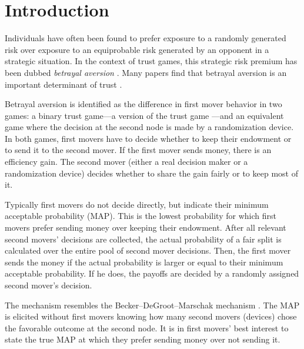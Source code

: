 \section{Introduction}\label{sec:intro}
Individuals have often been found to prefer exposure to a randomly generated risk over exposure to an equiprobable risk generated by an opponent in a strategic situation.
In the context of trust games, this strategic risk premium has been dubbed \textit{betrayal aversion} \citep{Bohnet2004}.
Many papers find that betrayal aversion is an important determinant of trust \citep{Bohnet2004, Aimone2015, Fairley2016, Quercia2016, Bacine2018, Butler2018, Polipciuc2022motive}.

Betrayal aversion is identified as the difference in first mover behavior in two games: a binary trust game---a version of the trust game \citep{Berg1995}---and an equivalent game where the decision at the second node is made by a randomization device.
In both games, first movers have to decide whether to keep their endowment or to send it to the second mover.
If the first mover sends money, there is an efficiency gain.
The second mover (either a real decision maker or a randomization device) decides whether to share the gain fairly or to keep most of it.

Typically first movers do not decide directly, but indicate their minimum acceptable probability (MAP).
This is the lowest probability for which first movers prefer sending money over keeping their endowment.
After all relevant second movers' decisions are collected, the actual probability of a fair split is calculated over the entire pool of second mover decisions.
Then, the first mover sends the money if the actual probability is larger or equal to their minimum acceptable probability.
If he does, the payoffs are decided by a randomly assigned second mover's decision.

The mechanism resembles the Becker--DeGroot--Marschak mechanism \citep[in short, BDM]{Becker1964}.
The MAP is elicited without first movers knowing how many second movers (devices) chose the favorable outcome at the second node.
It is in first movers' best interest to state the true MAP at which they prefer sending money over not sending it.

